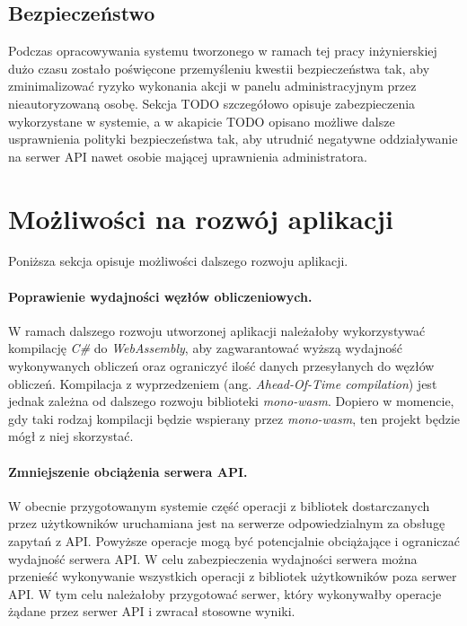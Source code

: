 \documentclass[a4paper,11pt,twoside]{report}
\theoremstyle{definition}
\begin{document}
        \subsection{Bezpieczeństwo}
            Podczas opracowywania systemu tworzonego w ramach tej pracy inżynierskiej dużo czasu zostało poświęcone przemyśleniu kwestii bezpieczeństwa tak, aby zminimalizować ryzyko wykonania akcji w panelu administracyjnym przez nieautoryzowaną osobę.
            Sekcja TODO szczegółowo opisuje zabezpieczenia wykorzystane w systemie, a w akapicie TODO opisano możliwe dalsze usprawnienia polityki bezpieczeństwa tak, aby utrudnić negatywne oddziaływanie na serwer API nawet osobie mającej uprawnienia administratora.
    
    \section{Możliwości na rozwój aplikacji}
        Poniższa sekcja opisuje możliwości dalszego rozwoju aplikacji.
    
        \paragraph{Poprawienie wydajności węzłów obliczeniowych.}
        W ramach dalszego rozwoju utworzonej aplikacji należałoby wykorzystywać kompilację \textit{C\#} do \textit{WebAssembly}, aby zagwarantować wyższą wydajność wykonywanych obliczeń oraz ograniczyć ilość danych przesyłanych do węzłów obliczeń. Kompilacja z wyprzedzeniem (ang. \textit{Ahead-Of-Time compilation}) jest jednak zależna od dalszego rozwoju biblioteki \textit{mono-wasm}. Dopiero w momencie, gdy taki rodzaj kompilacji będzie wspierany przez \textit{mono-wasm}, ten projekt będzie mógł z niej skorzystać.
        
        \paragraph{Zmniejszenie obciążenia serwera API.}
        W obecnie przygotowanym systemie część operacji z bibliotek dostarczanych przez użytkowników uruchamiana jest na serwerze odpowiedzialnym za obsługę zapytań z API. Powyższe operacje mogą być potencjalnie obciążające i ograniczać wydajność serwera API. W celu zabezpieczenia wydajności serwera można przenieść wykonywanie wszystkich operacji z bibliotek użytkowników poza serwer API. W tym celu należałoby przygotować serwer, który wykonywałby operacje żądane przez serwer API i zwracał stosowne wyniki.
        
\end{document}
